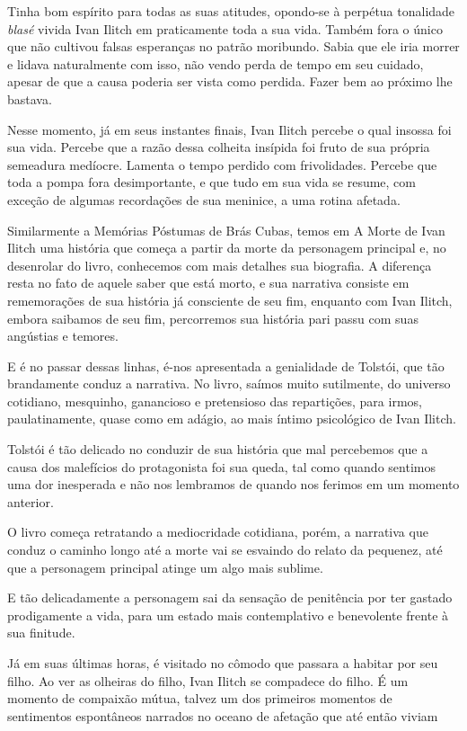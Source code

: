 \documentclass{extarticle}
\begin{document}
Tinha bom espírito para todas as suas atitudes, opondo-se à perpétua
tonalidade \emph{blasé} vivida Ivan Ilitch em praticamente toda a sua
vida. Também fora o único que não cultivou falsas esperanças no patrão
moribundo. Sabia que ele iria morrer e lidava naturalmente com isso, não
vendo perda de tempo em seu cuidado, apesar de que a causa poderia ser
vista como perdida. Fazer bem ao próximo lhe bastava.

Nesse momento, já em seus instantes finais, Ivan Ilitch percebe o qual
insossa foi sua vida. Percebe que a razão dessa colheita insípida foi
fruto de sua própria semeadura medíocre. Lamenta o tempo perdido com
frivolidades. Percebe que toda a pompa fora desimportante, e que tudo em
sua vida se resume, com exceção de algumas recordações de sua meninice,
a uma rotina afetada.

Similarmente a Memórias Póstumas de Brás Cubas, temos em A Morte de Ivan
Ilitch uma história que começa a partir da morte da personagem principal
e, no desenrolar do livro, conhecemos com mais detalhes sua biografia. A
diferença resta no fato de aquele saber que está morto, e sua narrativa
consiste em rememorações de sua história já consciente de seu fim,
enquanto com Ivan Ilitch, embora saibamos de seu fim, percorremos sua
história pari passu com suas angústias e temores.

E é no passar dessas linhas, é-nos apresentada a genialidade de Tolstói,
que tão brandamente conduz a narrativa. No livro, saímos muito
sutilmente, do universo cotidiano, mesquinho, ganancioso e pretensioso
das repartições, para irmos, paulatinamente, quase como em adágio, ao
mais íntimo psicológico de Ivan Ilitch.

Tolstói é tão delicado no conduzir de sua história que mal percebemos
que a causa dos malefícios do protagonista foi sua queda, tal como
quando sentimos uma dor inesperada e não nos lembramos de quando nos
ferimos em um momento anterior.

O livro começa retratando a mediocridade cotidiana, porém, a narrativa
que conduz o caminho longo até a morte vai se esvaindo do relato da
pequenez, até que a personagem principal atinge um algo mais sublime.

E tão delicadamente a personagem sai da sensação de penitência por ter
gastado prodigamente a vida, para um estado mais contemplativo e
benevolente frente à sua finitude.

Já em suas últimas horas, é visitado no cômodo que passara a habitar por
seu filho. Ao ver as olheiras do filho, Ivan Ilitch se compadece do
filho. É um momento de compaixão mútua, talvez um dos primeiros momentos
de sentimentos espontâneos narrados no oceano de afetação que até então
viviam
\end{document}
